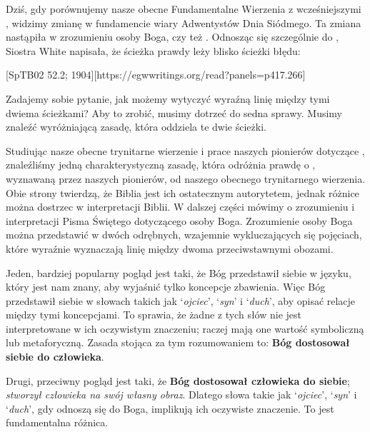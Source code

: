 
Dziś, gdy porównujemy nasze obecne Fundamentalne Wierzenia z wcześniejszymi , widzimy zmianę w fundamencie wiary Adwentystów Dnia Siódmego. Ta zmiana nastąpiła w zrozumieniu osoby Boga, czy też . Odnosząc się szczególnie do , Siostra White napisała, że ścieżka prawdy leży blisko ścieżki błędu:

[SpTB02 52.2; 1904][https://egwwritings.org/read?panels=p417.266]

Zadajemy sobie pytanie, jak możemy wytyczyć wyraźną linię między tymi dwiema ścieżkami? Aby to zrobić, musimy dotrzeć do sedna sprawy. Musimy znaleźć wyróżniającą zasadę, która oddziela te dwie ścieżki.

Studiując nasze obecne trynitarne wierzenie i prace naszych pionierów dotyczące , znaleźliśmy jedną charakterystyczną zasadę, która odróżnia prawdę o , wyznawaną przez naszych pionierów, od naszego obecnego trynitarnego wierzenia. Obie strony twierdzą, że Biblia jest ich ostatecznym autorytetem, jednak różnice można dostrzec w interpretacji Biblii. W dalszej części mówimy o zrozumieniu i interpretacji Pisma Świętego dotyczącego osoby Boga. Zrozumienie osoby Boga można przedstawić w dwóch odrębnych, wzajemnie wykluczających się pojęciach, które wyraźnie wyznaczają linię między dwoma przeciwstawnymi obozami.

Jeden, bardziej popularny pogląd jest taki, że Bóg przedstawił siebie w języku, który jest nam znany, aby wyjaśnić tylko koncepcje zbawienia. Więc Bóg przedstawił siebie w słowach takich jak ‘\textit{ojciec}’, ‘\textit{syn}’ i ‘\textit{duch}’, aby opisać relacje między tymi koncepcjami. To sprawia, że żadne z tych słów nie jest interpretowane w ich oczywistym znaczeniu; raczej mają one wartość symboliczną lub metaforyczną. Zasada stojąca za tym rozumowaniem to: \textbf{Bóg dostosował siebie do człowieka}.

Drugi, przeciwny pogląd jest taki, że \textbf{Bóg dostosował człowieka do siebie}; \textit{stworzył człowieka na swój własny obraz}. Dlatego słowa takie jak ‘\textit{ojciec}’, ‘\textit{syn}’ i ‘\textit{duch}’, gdy odnoszą się do Boga, implikują ich oczywiste znaczenie. To jest fundamentalna różnica.

